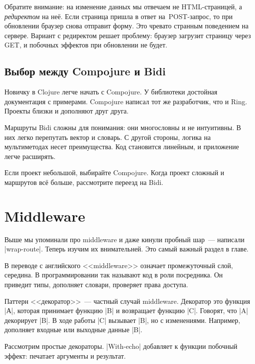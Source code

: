 Обратите внимание: на изменение данных мы отвечаем не HTML-страницей, а
\emph{редиректом} на не\"{е}. Если страница пришла в ответ на~POST-запрос, то при
обновлении браузер снова отправит форму. Это чревато странным поведением на
сервере. Вариант с редиректом решает проблему: браузер загрузит страницу через
GET, и побочных эффектов при обновлении не будет.

\subsection{Выбор между Compojure и Bidi}

Новичку в Clojure легче начать с Compojure. У библиотеки достойная документация
с примерами. Compojure написал тот же разработчик, что и Ring. Проекты близки и
дополняют друг друга.

Маршруты Bidi сложны для понимания: они многословны и не интуитивны. В них легко
перепутать вектор и словарь. С другой стороны, логика на мультиметодах несет
преимущества. Код становится линейным, и приложение легче расширять.

Если проект небольшой, выбирайте Compojure. Когда проект сложный и маршрутов вс\"{е}
больше, рассмотрите переезд на Bidi.

\section{Middleware}


Выше мы упоминали про middleware и даже кинули пробный шар~--- написали
\spverb|wrap-route|. Теперь изучим их внимательней. Это самый важный раздел в
главе.

В переводе с английского <<middleware>> означает промежуточный слой, середина. В
программировании так называют код в роли посредника. Он приведит типы, дополняет
словари, проверяет права доступа.

\label{decorator}


Паттерн <<декоратор>>~--- частный случай middleware. Декоратор это функция
\spverb|А|, которая принимает функцию \spverb|B| и возвращает функцию
\spverb|C|. Говорят, что \spverb|A| декорирует \spverb|B|. В ходе работы
\spverb|C| вызывает \spverb|B|, но с изменениями. Например, дополняет входные
или выходные данные \spverb|B|.

Рассмотрим простые декораторы. \spverb|With-echo| добавляет к функции побочный
эффект: печатает аргументы и результат.

